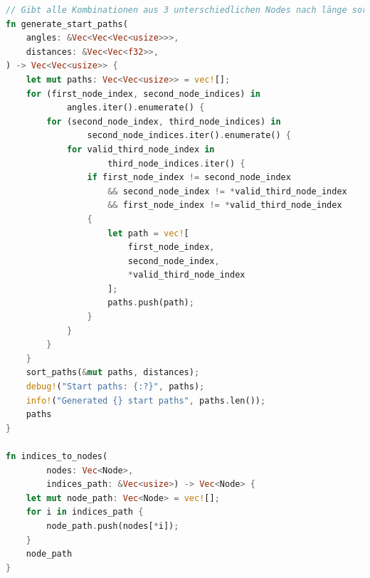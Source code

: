 \documentclass[a4paper,10pt,ngerman]{scrartcl}
\begin{document}
\begin{lstlisting}[language=Rust]
// Gibt alle Kombinationen aus 3 unterschiedlichen Nodes nach länge sortiert zurück
fn generate_start_paths(
    angles: &Vec<Vec<Vec<usize>>>,
    distances: &Vec<Vec<f32>>,
) -> Vec<Vec<usize>> {
    let mut paths: Vec<Vec<usize>> = vec![];
    for (first_node_index, second_node_indices) in 
            angles.iter().enumerate() {
        for (second_node_index, third_node_indices) in 
                second_node_indices.iter().enumerate() {
            for valid_third_node_index in 
                    third_node_indices.iter() {
                if first_node_index != second_node_index
                    && second_node_index != *valid_third_node_index
                    && first_node_index != *valid_third_node_index
                {
                    let path = vec![
                        first_node_index, 
                        second_node_index, 
                        *valid_third_node_index
                    ];
                    paths.push(path);
                }
            }
        }
    }
    sort_paths(&mut paths, distances);
    debug!("Start paths: {:?}", paths);
    info!("Generated {} start paths", paths.len());
    paths
}

fn indices_to_nodes(
        nodes: Vec<Node>, 
        indices_path: &Vec<usize>) -> Vec<Node> {
    let mut node_path: Vec<Node> = vec![];
    for i in indices_path {
        node_path.push(nodes[*i]);
    }
    node_path
}


\end{lstlisting}
\end{document}
